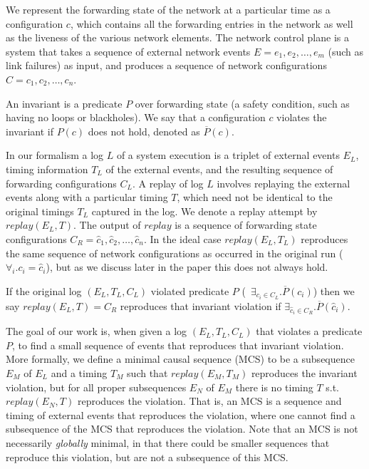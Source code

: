 
We represent the forwarding state of the network
at a particular time as a configuration $c$, which contains all the forwarding
entries in the network
as well as the liveness of the various network elements.
The network control plane is a system that takes a sequence of
external network events $E = e_1,e_2,\dots,e_m$ (such as link failures) as input,
and produces a sequence of network configurations
$C = c_1,c_2,\dots,c_n$.

An invariant is a predicate $P$ over forwarding state (a safety
condition, such as having no loops or blackholes). We say that a configuration
$c$ violates the invariant if $P(c)$ does not
hold, denoted as $\overline{P}(c)$.

In our formalism a log $L$ of a system execution is a triplet of external events $E_L$,
timing information $T_L$ of the external events, and the resulting sequence of forwarding
configurations $C_L$.
A replay of log $L$ involves replaying the external events along with a
particular timing $T$,
which need not be identical to the original timings $T_L$ captured in the log.
We denote a replay attempt by $replay(E_L,T)$.
The output of $replay$ is a sequence of forwarding state configurations
$C_R = \hat{c}_1,\hat{c}_2,\dots,\hat{c}_n$. In the ideal case $replay(E_L,T_L)$ reproduces the same
sequence of network configurations as occurred in the original run
(\ie~$\forall_i. c_i = \hat{c}_i$), but as we discuss later in the paper
this does not always hold.

If the original log $(E_L, T_L, C_L)$ violated predicate $P$
(\ie~$\exists_{c_i \in C_L}. \overline{P}(c_i)$)
then we say $replay(E_L,T) = C_R$ reproduces that invariant violation if
$\exists_{\hat{c}_i \in C_R}. \overline{P}(\hat{c}_i)$.

The goal of our work is, when given a log $(E_L, T_L, C_L)$ that violates a predicate $P$, to find a small sequence of events that reproduces that
invariant violation.  More formally, we define a minimal causal sequence (MCS)
to be a subsequence $E_M$
of $E_L$ and a timing $T_M$ such
that $replay(E_M,T_M)$ reproduces the invariant violation, but for all proper
subsequences $E_N$ of $E_M$
there is no timing $T$ s.t. $replay(E_N,T)$ reproduces the violation.
That is, an MCS is a sequence and timing of external events that reproduces the violation,
where one cannot find a subsequence of the MCS that reproduces the violation.
Note that an MCS is not necessarily {\em globally} minimal, in that there could be smaller
sequences that reproduce this violation, but are not a subsequence of this MCS.

